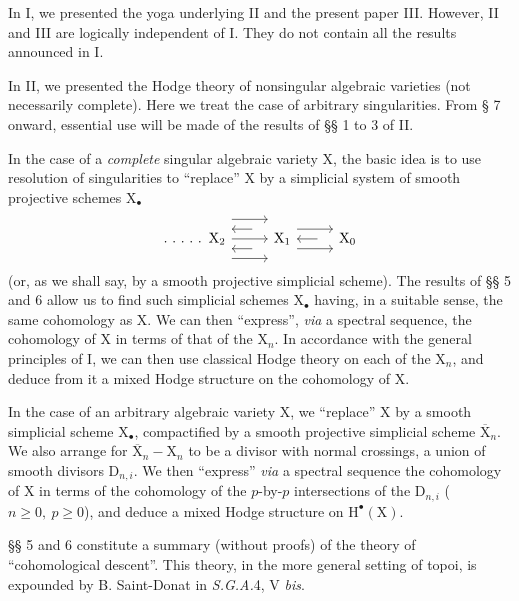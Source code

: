 \documentclass[11pt,leqno]{article}
\begin{document}
In I, we presented the yoga underlying II and the present paper III. However, II and III are logically independent of I. They do not contain all the results announced in I.

In II, we presented the Hodge theory of nonsingular algebraic varieties (not necessarily complete). Here we treat the case of arbitrary singularities. From § 7 onward, essential use will be made of the results of §§ 1 to 3 of II.

In the case of a \textit{complete} singular algebraic variety \(\mathrm{X}\), the basic idea is to use resolution of singularities to “replace” \(\mathrm{X}\) by a simplicial system of smooth projective schemes \(\mathrm{X}_{\bullet}\)
\[
\begin{tikzcd}[column sep=2.6em]
\ldotp\,\ldotp\,\ldotp\,\ldotp\,\ldotp\ \mathrm{X}_2
  \arrow[r, shift left=3.2ex]
  \arrow[r]
  \arrow[r, shift right=3.2ex]
&
\mathrm{X}_1
  \arrow[l, shift right=1.6ex, shorten <=1.1em]
  \arrow[l, shift left=1.6ex, shorten <=1.1em]
  \arrow[r, shift left=1.6ex]
  \arrow[r, shift right=1.6ex]
&
\mathrm{X}_0
  \arrow[l, shorten <=1.1em]
\end{tikzcd}
\]
(or, as we shall say, by a smooth projective simplicial scheme). The results of §§ 5 and 6 allow us to find such simplicial schemes \(\mathrm{X}_{\bullet}\) having, in a suitable sense, the same cohomology as \(\mathrm{X}\). We can then “express”, \textit{via} a spectral sequence, the cohomology of \(\mathrm{X}\) in terms of that of the \(\mathrm{X}_n\). In accordance with the general principles of I, we can then use classical Hodge theory on each of the \(\mathrm{X}_n\), and deduce from it a mixed Hodge structure on the cohomology of \(\mathrm{X}\).

In the case of an arbitrary algebraic variety \(\mathrm{X}\), we “replace” \(\mathrm{X}\) by a smooth simplicial scheme \(\mathrm{X}_{\bullet}\), compactified by a smooth projective simplicial scheme \(\overline{\mathrm{X}}_n\). We also arrange for \(\overline{\mathrm{X}}_n-\mathrm{X}_n\) to be a divisor with normal crossings, a union of smooth divisors \(\mathrm{D}_{n,i}\). We then “express” \textit{via} a spectral sequence the cohomology of \(\mathrm{X}\) in terms of the cohomology of the \(p\)-by-\(p\) intersections of the \(\mathrm{D}_{n,i}\) (\(n\geq 0,\ p\geq 0\)), and deduce a mixed Hodge structure on \(\mathrm{H}^{\bullet}(\mathrm{X})\).

§§ 5 and 6 constitute a summary (without proofs) of the theory of “cohomological descent”. This theory, in the more general setting of topoi, is expounded by B. Saint-Donat in \textit{S.G.A.}4, V \textit{bis}.
\end{document}
